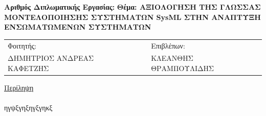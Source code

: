 \documentclass[a4paper,12pt,twoside]{report}
\newcommand{ \FirstName}{ΔΗΜΗΤΡΙΟΣ ΑΝΔΡΕΑΣ }
\newcommand{ \LastName}{ΚΑΦΕΤΖΗΣ}
\newcommand{ \ThesisTitle}{ΑΞΙΟΛΟΓΗΣΗ ΤΗΣ ΓΛΩΣΣΑΣ ΜΟΝΤΕΛΟΠΟΙΗΣΗΣ ΣΥΣΤΗΜΑΤΩΝ SysML ΣΤΗΝ ΑΝΑΠΤΥΞΗ ΕΝΣΩΜΑΤΩΜΕΝΩΝ ΣΥΣΤΗΜΑΤΩΝ}
\newcommand{ \FirstProfessor}{ΚΛΕΑΝΘΗΣ ΘΡΑΜΠΟΥΛΙΔΗΣ}
\begin{document}
	{\label{Τρίτη σελίδα} 
		\newpage
		\begin{large}
			\begin{flushleft}
				\textbf{Αριθμός Διπλωματικής Εργασίας:}\linebreak \linebreak
				\textbf{Θέμα: \ThesisTitle} \linebreak \linebreak
			\end{flushleft}
			\begin{tabular}{p{6cm} p{1cm} p{6cm}}
				Φοιτητής: & & Επιβλέπων:\\
				\FirstName \LastName & & \FirstProfessor\\
			\end{tabular}
			\linebreak \linebreak
			\begin{flushleft}\underline{{\large Περίληψη}}	\end{flushleft}
			\paragraph{} {
				ηγψξγηξηγξγηκξ
				}
		\end{large}
	}
		
\newpage

\setlength{\parskip}{0ex plus 0.5ex minus 0.2ex}
\tableofcontents

\listoffigures
{}

\listoftables
{}



\setlength{\parskip}{1.3ex plus 0.2ex minus 0.2ex}


\makeatletter
	\def\cleardoublepage{
		\clearpage\if@twoside \ifodd\c@page\else
	    \hbox{}
	    \thispagestyle{plain}
	    \newpage
    	\if@twocolumn\hbox{}\newpage\fi\fi\fi
    }
\makeatother \clearpage{\pagestyle{plain}\cleardoublepage}
\end{document}

